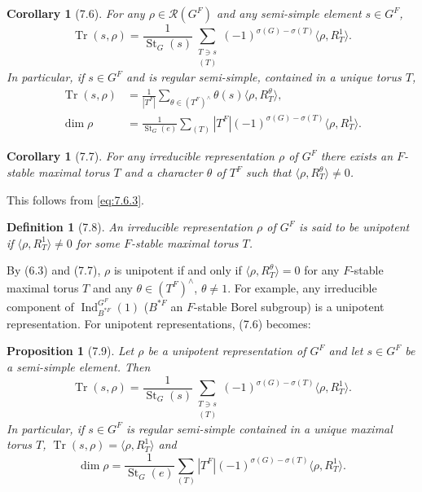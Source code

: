 \documentclass[11pt]{amsart}
\theoremstyle{plain}
\newtheorem{proposition}[theorem]{Proposition}
\newtheorem{corollary}[theorem]{Corollary}
\newtheorem{definition}[theorem]{Definition}
\theoremstyle{remark}
\DeclareMathOperator{\Ind}{Ind}
\DeclareMathOperator{\Tr}{Tr}
\DeclareMathOperator{\St}{St}
\begin{document}
\begin{corollary}[7.6]
For any $\rho \in \mathcal{R}(G^F)$ and any semi-simple element $s \in G^F$,
\begin{equation}\label{eq:7.6.1}
\Tr(s, \rho) = \frac{1}{\St_G(s)} \sum_{\substack{T \ni s \\ (T)}} (-1)^{\sigma(G) - \sigma(T)} \langle \rho, R_T^1 \rangle.
\end{equation}
In particular, if $s \in G^F$ and is regular semi-simple, contained in a unique torus $T$,
\begin{align}
\Tr(s, \rho) &= \frac{1}{|T^F|} \sum_{\theta \in (T^F)^\wedge} \theta(s) \langle \rho, R_T^\theta \rangle, \label{eq:7.6.2} \\
\dim \rho &= \frac{1}{\St_G(e)} \sum_{(T)} |T^F|(-1)^{\sigma(G) - \sigma(T)} \langle \rho, R_T^1 \rangle. \label{eq:7.6.3}
\end{align}
\end{corollary}

\begin{corollary}[7.7]
For any irreducible representation $\rho$ of $G^F$ there exists an $F$-stable maximal torus $T$ and a character $\theta$ of $T^F$ such that $\langle \rho, R_T^\theta \rangle \neq 0$.
\end{corollary}

This follows from \eqref{eq:7.6.3}.

\begin{definition}[7.8]
An irreducible representation $\rho$ of $G^F$ is said to be \textit{unipotent} if $\langle \rho, R_T^1 \rangle \neq 0$ for some $F$-stable maximal torus $T$.
\end{definition}

By (6.3) and (7.7), $\rho$ is unipotent if and only if $\langle \rho, R_T^\theta \rangle = 0$ for any $F$-stable maximal torus $T$ and any $\theta \in (T^F)^\wedge$, $\theta \neq 1$. For example, any irreducible component of $\Ind_{B^{*F}}^{G^F}(1)$ ($B^{*F}$ an $F$-stable Borel subgroup) is a unipotent representation. For unipotent representations, (7.6) becomes:

\begin{proposition}[7.9]
Let $\rho$ be a unipotent representation of $G^F$ and let $s \in G^F$ be a semi-simple element. Then
\[
\Tr(s, \rho) = \frac{1}{\St_G(s)} \sum_{\substack{T \ni s \\ (T)}} (-1)^{\sigma(G) - \sigma(T)} \langle \rho, R_T^1 \rangle.
\]
In particular, if $s \in G^F$ is regular semi-simple contained in a unique maximal torus $T$, $\Tr(s, \rho) = \langle \rho, R_T^1 \rangle$ and
\[
\dim \rho = \frac{1}{\St_G(e)} \sum_{(T)} |T^F| (-1)^{\sigma(G) - \sigma(T)} \langle \rho, R_T^1 \rangle.
\]
\end{proposition}
\end{document}
